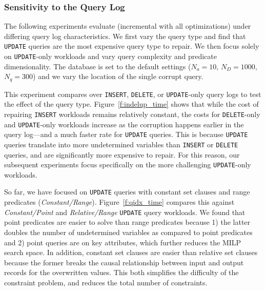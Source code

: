 \subsubsection{Sensitivity to the Query Log}
\label{sec:experiments:synth}

The following experiments evaluate \sys (incremental with all optimizations) under differing query log characteristics.
We first vary the query type and find that \texttt{UPDATE} queries are the most expensive query type to repair.
We then focus solely on \texttt{UPDATE}-only workloads and vary query complexity and predicate dimensionality.
The database is set to the default settings ($N_a=10$, $N_D=1000$, $N_q=300$) and we vary the location of the single corrupt query.

\label{sec:indelup}
This experiment compares \sys over \texttt{INSERT}, \texttt{DELETE}, or \texttt{UPDATE}-only query logs to test the effect of the query type.
Figure~\ref{f:indelup_time} shows that while the cost of repairing \texttt{INSERT} workloads
remains relatively constant, the costs for \texttt{DELETE}-only and \texttt{UPDATE}-only workloads increase as 
the corruption happens earlier in the query log---and a much faster rate for \texttt{UPDATE} queries.
This is because \texttt{UPDATE} queries translate into more undetermined variables than \texttt{INSERT} or \texttt{DELETE} queries, and are significantly more expensive to repair. 
For this reason, our subsequent experiments focus specifically on the more challenging \texttt{UPDATE}-only workloads.

\smallskip
{}
So far, we have focused on \texttt{UPDATE} queries with constant set clauses and range predicates ({\it Constant/Range}).  
Figure~\ref{f:qidx_time} compares this against {\it Constant/Point} and {\it Relative/Range} \texttt{UPDATE} query workloads. 
We found that point predicates are easier to solve than range predicates because 
1) the latter doubles the number of undetermined variables as compared to point predicates and 
2) point queries are on key attributes, which further reduces the MILP search space.
In addition, constant set clauses are easier than relative set clauses because
the former breaks the causal relationship between input and output records for the overwritten values.
This both simplifies the difficulty of the constraint problem, and reduces the total number of constraints.


